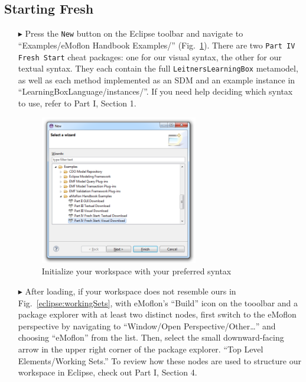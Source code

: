 \subsection{Starting Fresh}
\label{sec:loadSourceMeta}
\begin{itemize}

\item[$\blacktriangleright$] Press the \texttt{New} button on the Eclipse toolbar and navigate to ``Examples/eMoflon Handbook Examples/''
(Fig.~\ref{eclipse:downPartIV}). There are two \texttt{Part IV Fresh Start} cheat packages: one for our visual syntax, the other for our textual
syntax. They each contain the full \texttt{LeitnersLearningBox} metamodel, as well as each method implemented as an SDM and an example instance in
``LearningBoxLanguage/instances/''. If you need help deciding which syntax to use, refer to Part I, Section 1.

\begin{figure}[htbp]
\begin{center}
  \includegraphics[width=0.65\textwidth]{eclipse_part4FreshWizardDownload}
  \caption{Initialize your workspace with your preferred syntax}
  \label{eclipse:downPartIV}
\end{center}
\end{figure}

\vspace{0.5cm}

\item[$\blacktriangleright$] After loading, if your workspace does not resemble ours in Fig.~\ref{eclipse:workingSets}, with eMoflon's ``Build'' icon on the
tooolbar and a package explorer with at least two distinct nodes, first switch to the eMoflon perspective by navigating to ``Window/Open
Perspective/Other\ldots'' and choosing ``eMoflon'' from the list. Then, select the small downward-facing arrow in the upper right corner of the package
explorer. ``Top Level Elements/Working Sets.'' To review how these nodes are used to structure our workspace in Eclipse, check out Part I, Section 4.


\end{itemize}
